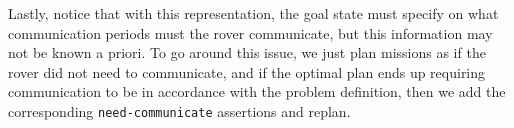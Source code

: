 Lastly, notice that with this representation, the goal state must specify on what communication periods
must the rover communicate, but this information may not be known a priori. To go around this issue, we just
plan missions as if the rover did not need to communicate, and if the optimal plan ends up requiring
communication to be in accordance with the problem definition, then we add the corresponding
\texttt{need-communicate} assertions and replan.